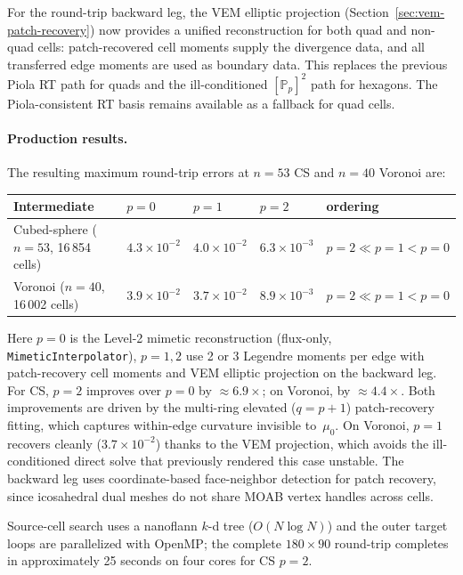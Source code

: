 \documentclass[11pt]{article}
\begin{document}
For the round-trip backward leg, the VEM elliptic projection
(Section~\ref{sec:vem-patch-recovery}) now provides a unified reconstruction for
both quad and non-quad cells: patch-recovered cell moments supply the
divergence data, and all transferred edge moments are used as boundary data.
This replaces the previous Piola RT path for quads and the ill-conditioned
\([\mathbb{P}_p]^2\) path for hexagons.  The Piola-consistent RT basis remains
available as a fallback for quad cells.

\paragraph{Production results.}
The resulting maximum round-trip errors at \(n=53\) CS and \(n=40\) Voronoi are:

\begin{center}
\begin{tabular}{lllll}
\toprule
Intermediate & \(p=0\) & \(p=1\) & \(p=2\) & ordering \\
\midrule
Cubed-sphere (\(n=53\), 16\,854 cells) &
  \(4.3\times10^{-2}\) & \(4.0\times10^{-2}\) & \(6.3\times10^{-3}\) &
  \(p=2 \ll p=1 < p=0\) \\
Voronoi (\(n=40\), 16\,002 cells) &
  \(3.9\times10^{-2}\) & \(3.7\times10^{-2}\) & \(8.9\times10^{-3}\) &
  \(p=2 \ll p=1 < p=0\) \\
\bottomrule
\end{tabular}
\end{center}

Here \(p=0\) is the Level-2 mimetic reconstruction (flux-only, \texttt{MimeticInterpolator}),
\(p=1{,}2\) use 2 or 3 Legendre moments per edge with patch-recovery cell moments
and VEM elliptic projection on the backward leg.
For CS, \(p=2\) improves over \(p=0\) by \(\approx 6.9\times\);
on Voronoi, by \(\approx 4.4\times\).  Both improvements are driven by the
multi-ring elevated (\(q=p+1\)) patch-recovery fitting, which captures
within-edge curvature invisible to~\(\mu_0\).
On Voronoi, \(p=1\) recovers cleanly (\(3.7\times10^{-2}\)) thanks to the
VEM projection, which avoids the ill-conditioned direct solve that previously
rendered this case unstable.
The backward leg uses coordinate-based face-neighbor detection for patch
recovery, since icosahedral dual meshes do not share MOAB vertex handles
across cells.

Source-cell search uses a nanoflann \(k\)-d tree (\(O(N\log N)\)) and the
outer target loops are parallelized with OpenMP; the complete \(180\times90\)
round-trip completes in approximately 25 seconds on four cores for CS \(p=2\).
\end{document}
